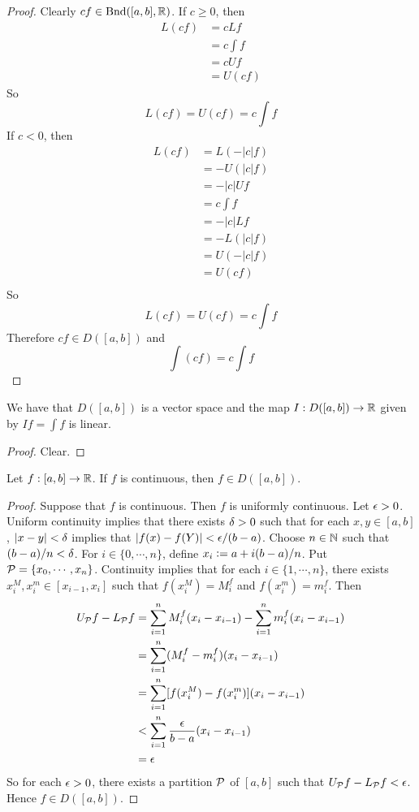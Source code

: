 \documentclass{book}
\begin{document}
	\begin{proof}
		Clearly $cf \in \text{Bnd}([a,b], \mathbb{R})$. If $c \geq 0$, then 
		\begin{align*}
			L (cf) 
			&= c Lf \\
			&= c \int f \\
			&= c Uf \\
			&= U(cf)
		\end{align*} 
		So $$L(cf) = U(cf) = c \int f$$ If $c <0$, then 
		\begin{align*}
			L (cf) 
			&= L(-|c| f) \\
			&= -U(|c|f) \\
			&= - |c|Uf \\
			&= c \int f \\
			&= -|c| L f \\
			&= - L(|c|f) \\
			&= U(-|c|f) \\
			&= U (c f) \\
		\end{align*} 
		So $$L(cf) = U(cf) = c \int f$$ Therefore $cf \in D([a,b])$ and $$\int (cf) = c \int f$$
	\end{proof}

	\begin{cor}
		We have that $D([a,b])$ is a vector space and the map $I: D([a,b]) \rightarrow \mathbb{R}$ given by $If = \int f$ is linear.
	\end{cor}

	\begin{proof}
		Clear.
	\end{proof}

	\begin{ex}  
		Let $f:[a,b] \rightarrow \mathbb{R}$. If $f$ is continuous, then $f \in D([a,b])$. 
	\end{ex}

	\begin{proof}
		Suppose that $f$ is continuous. Then $f$ is uniformly continuous. Let $\epsilon >0$. Uniform continuity implies that there exists $\delta > 0$ such that for each $x, y \in [a,b]$, $|x-y| < \delta$ implies that $|f(x) - f(Y)| < \epsilon/(b-a)$. Choose $n \in \mathbb{N}$ such that $(b-a)/n < \delta$. For $i \in \{0, \cdots, n\}$, define $x_i \vcentcolon= a + i(b-a)/n$. Put $\mathcal{P} = \{x_0, \cdots, x_n\}$. Continuity implies that for each $i \in \{1, \cdots, n\}$, there exists $x_i^M, x_i^m \in [x_{i-1}, x_i]$ such that $f(x_i^M) = M_i^f$ and $f(x_i^m) = m_i^f$. Then 
		\begin{align*}
			U_{\mathcal{P}} f - L_{\mathcal{P}} f 
			&= \sum\limits_{i=1}^n M^f_i(x_i - x_{i-1}) - \sum\limits_{i=1}^n m^f_i(x_i - x_{i-1}) \\
			&= \sum\limits_{i=1}^n (M^f_i - m^f_i)(x_i - x_{i-1}) \\
			&= \sum\limits_{i=1}^n [f(x_i^M) - f(x_i^m)](x_i - x_{i-1}) \\
			& < \sum\limits_{i=1}^n \frac{\epsilon}{b-a}(x_i - x_{i-1}) \\
			&= \epsilon 
		\end{align*}
		So for each $\epsilon >0$, there exists a partition $\mathcal{P}$ of $[a,b]$ such that $U_{\mathcal{P}} f - L_{\mathcal{P}} f < \epsilon$. Hence $f \in D([a,b])$.
	\end{proof}
\end{document}
